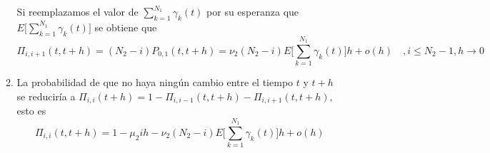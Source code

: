 \begin{itemize}
\begin{enumerate}
        Si reemplazamos el valor de $\sum_{k=1}^{N_1}\gamma_k(t)$ por su esperanza que $E\big[\sum_{k=1}^{N_1}\gamma_k(t)\big]$ se obtiene que
        $$\Pi_{i,i+1}(t,t+h)=(N_2-i)P_{0,1}(t,t+h)= \nu_2(N_2-i)E\bigg[\sum_{k=1}^{N_1}\gamma_k(t)\bigg]h+o(h)\quad ,i\leq N_2-1, h\rightarrow 0$$
        \item La probabilidad de que no haya ningún cambio entre el tiempo $t$ y $t+h$ se reduciría a  $\Pi_{i,i}(t+h)=1-\Pi_{i,i-1}(t,t+h)-\Pi_{i,i+1}(t,t+h)$, esto es $$\Pi_{i,i}(t,t+h)=1-\mu_2 i h-\nu_2(N_2-i)E\bigg[\sum_{k=1}^{N_1}\gamma_k(t)\bigg]h+o(h)$$
    \end{enumerate}
\end{itemize}
\begin{comment}
    \begin{Prop}
    \begin{eqnarray}
        E[S(t)]=\sum_{j=1}^{N_2}j\sum_{i=1}^{N_2}\pi_{i}\Pi_{i,j}(0,t).
        \label{equation-E(S)-probInicial}
    \end{eqnarray}
\end{Prop}
\begin{Prop}
    \begin{eqnarray}
    \label{equation-E(gamma)-probInicial}
        \begin{array}{cr}
            E\bigg[\sum_{k=1}^{N_1}\gamma_k(t)\bigg]=& \sum_{k=1}^{N_1}\sum_{r=1}^\infty\bigg[\sum_{\rho=0}^\infty p_\rho^{(k)}P_{\rho,r}(0,t)\sum_{n=r}^\infty\sum_{m=0}q_m^{(k)}P_{m,n}(0,t) \\
             &+\sum_{n=r+1}^\infty\sum_{\rho=0}^\infty p_j^{(k)}P_{\rho, n}(0,t)\sum_{m=0}^\infty q_m^{(k)}P_{m,r}(0,t)\bigg]
        \end{array}
    \end{eqnarray}
\end{Prop}
Usando las relaciones \ref{equation-E(S)-probInicial} y \ref{equation-E(gamma)-probInicial} los precedentes postulados pueden ser expresados usando solo las distribuciones iniciales y las transiciones $\Pi_{i,j}(0,t)$ y $P_{m,n}(0,t)$.\\
\end{comment}
